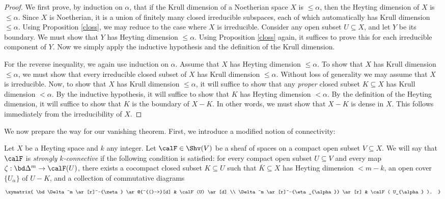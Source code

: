 \begin{proof}
We first prove, by induction on $\alpha$, that if the Krull
dimension of a Noetherian space $X$ is $\leq \alpha$, then the
Heyting dimension of $X$ is $\leq \alpha$. Since $X$ is Noetherian,
it is a union of finitely many closed irreducible subspaces, each of which automatically has Krull
dimension $\leq \alpha$. Using Proposition \ref{closs}, we may
reduce to the case where $X$ is irreducible. Consider any open subset $U \subseteq X$, and let $Y$ be its boundary. We must show that $Y$ has Heyting dimension $\leq
\alpha$. Using Proposition \ref{closs} again, it suffices to prove
this for each irreducible component of $Y$. Now we simply apply
the inductive hypothesis and the definition of the Krull
dimension.

For the reverse inequality, we again use induction on $\alpha$.
Assume that $X$ has Heyting dimension $\leq \alpha$. To show that
$X$ has Krull dimension $\leq \alpha$, we must show that every
irreducible closed subset of $X$ has Krull dimension $\leq
\alpha$. Without loss of generality we may assume that $X$ is
irreducible. Now, to show that $X$ has Krull dimension $\leq
\alpha$, it will suffice to show that any {\em proper} closed
subset $K \subseteq X$ has Krull dimension $< \alpha$. By the
inductive hypothesis, it will suffice to show that $K$ has Heyting
dimension $< \alpha$. By the definition of the Heyting dimension,
it will suffice to show that $K$ is the boundary of $X - K$. In
other words, we must show that $X - K$ is dense in $X$. This
follows immediately from the irreducibility of $X$.
\end{proof}

We now prepare the way for our vanishing theorem. First, we
introduce a modified notion of connectivity:

\begin{definition}\label{strongcon}
Let $X$ be a Heyting space and $k$ any integer. Let $\calF \in \Shv(V)$ 
be a sheaf of spaces
on a compact open subset $V \subseteq X$. We will say that $\calF$ is {\it strongly $k$-connective}
if the following condition is satisfied: for every compact open subset $U \subseteq V$
and every map $\zeta: \bd \Delta^m \rightarrow \calF(U)$, there exists a cocompact
closed subset $K \subseteq U$ such that $\overline{K} \subseteq X$ has Heyting dimension
$< m-k$, an open cover $\{ U_{\alpha} \}$ of $U-K$, and a collection of commutative diagrams
$$ \xymatrix{ \bd \Delta^m \ar[r]^-{\zeta} \ar@{^{(}->}[d] & \calF(U) \ar[d] \\
\Delta^m \ar[r]^-{\eta_{\alpha}} \ar[r] & \calF( U_{\alpha} ). } $$
\end{definition}

